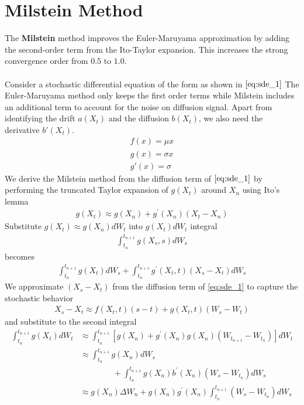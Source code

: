 \section*{Milstein Method}
The \textbf{Milstein} \cite{wiki:milstein-method} method improves the Euler-Maruyama approximation by adding the second-order term from the Ito-Taylor expansion. This increases the strong convergence order from $0.5$ to $1.0$.
\\
\\
Consider a stochastic differential equation of the form as shown in $\eqref{eq:sde_1}$ 
The Euler-Maruyama method only keeps the first order terms while Milstein includes an additional term to account for the noise on diffusion signal. Apart from identifying the drift $a(X_t)$ and the diffusion $b(X_t)$, we also need the derivative $b'(X_t)$.
\begin{align*}
f(x) = \mu x\\
g(x) = \sigma x\\
g'(x) = \sigma
\end{align*}
We derive the Milstein method from the diffusion term of $\eqref{eq:sde_1}$ by performing the truncated Taylor expansion of $g(X_t)$ around $X_n$ using Ito's lemma
\begin{align*}
g(X_t) \approx g(X_n) + g^{'}(X_n)(X_t-X_n)
\end{align*}
Substitute $g(X_t)\approx g(X_n)dW_t$ into $g(X_t)dW_t$ integral
\begin{align*}
\int_{t_n}^{t_{n+1}}g(X_s,s)dW_s
\end{align*}
becomes
\begin{align*}
\int_{t_n}^{t_{n+1}} g(X_t)dW_s + \int_{t_n}^{t_{n+1}} g^{'}(X_t,t) (X_s - X_t)dW_s
\end{align*}
We approximate $(X_s - X_t)$ from the diffusion term of \eqref{eq:sde_1} to capture the stochastic behavior
\begin{align*}
X_s - X_t \approx f(X_t,t)(s-t) + g(X_t,t)(W_s-W_t)
\end{align*}
and substitute to the second integral
\begin{align*}
\int_{t_n}^{t_{n+1}} g(X_t)dW_t &\approx \int_{t_n}^{t_{n+1}}\left[g(X_n) + g^{'}(X_n) g(X_n)(W_{t_{n+1}}-W_{t_n})\right]dW_t\\
&\approx \int_{t_n}^{t_{n+1}} g(X_n) dW_s \\ 
&\qquad\qquad + \int_{t_n}^{t_{n+1}} g(X_n)b^{'}(X_n)(W_s-W_{t_n})dW_s\\
&\approx g(X_n) \Delta W_n + g(X_n)g^{'}(X_n) \int_{t_n}^{t_{n+1}} (W_{s} - W_{t_n}) dW_s
\end{align*}
